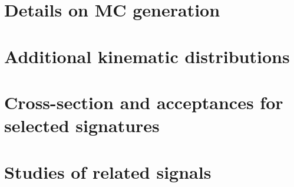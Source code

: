 \documentclass[a4paper, 11pt,notoc]{article}
\begin{document}
\section{Details on MC generation}


\section{Additional kinematic distributions}
\label{app:extraKinematics}


\section{Cross-section and acceptances for selected signatures}


%

\section{Studies of related signals}




\end{document}
